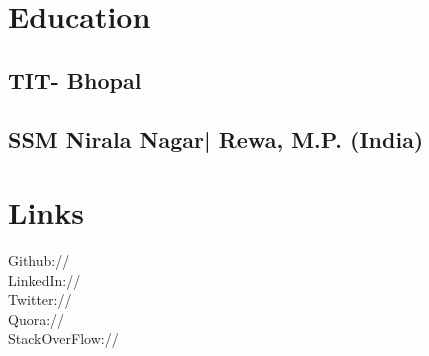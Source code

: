 \documentclass[]{prashant-resume-openfont}
\begin{document}
%
%
\lastupdated

%
%



%
%

\begin{minipage}[t]{0.33\textwidth} 


\section{Education} 

\subsection{TIT- Bhopal}
\sectionsep


\subsection{SSM Nirala Nagar| Rewa, M.P. (India)}
\sectionsep


\section{Links} 
Github:// \href{https://github.com/prashantdubey07}{} \\
LinkedIn://  \href{https://www.linkedin.com/in/prashantdubey07}{} \\
Twitter://  \href{https://twitter.com/prashantdubey07}{} \\
Quora://  \href{http://www.quora.com/Prashant-Dubey-28}{} \\
StackOverFlow://  \href{http://stackoverflow.com/users/2987706/prashant}{}
\sectionsep


\end{minipage}
\end{document}
